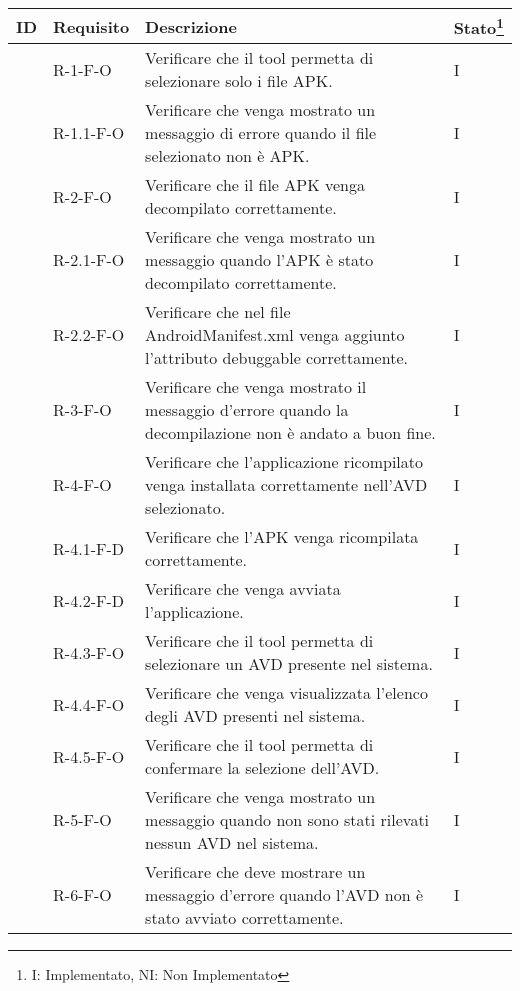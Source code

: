\begin{longtable}{ | C{1.5cm} |C{2cm} |C{7cm} |C{1.5cm}|}
    \hline
    \textbf{ID} &
    \textbf{Requisito} &
    \textbf{Descrizione} &
    \textbf{Stato\footnote{I: Implementato, NI: Non Implementato}} \\\hline

     & R-1-F-O    & Verificare che il tool permetta di selezionare solo i file APK.                                                     & I \\\hline
     & R-1.1-F-O  & Verificare che venga mostrato un messaggio di errore quando il file selezionato non è APK.                          & I \\\hline
     & R-2-F-O    & Verificare che il file APK venga decompilato correttamente.& I \\\hline
     & R-2.1-F-O  & Verificare che venga mostrato un messaggio quando l'APK è stato decompilato correttamente.& I \\\hline
     & R-2.2-F-O  & Verificare che nel file AndroidManifest.xml venga aggiunto l'attributo debuggable correttamente.& I \\\hline
     & R-3-F-O    & Verificare che venga mostrato il messaggio d'errore quando la decompilazione non è andato a buon fine.& I \\\hline
     & R-4-F-O    & Verificare che l'applicazione ricompilato venga installata correttamente nell'AVD selezionato.& I \\\hline
     & R-4.1-F-D  & Verificare che l'APK venga ricompilata correttamente.& I \\\hline
     & R-4.2-F-D  & Verificare che venga avviata l'applicazione.& I \\\hline
     & R-4.3-F-O  & Verificare che il tool permetta di selezionare un AVD presente nel sistema.& I \\\hline
     & R-4.4-F-O  & Verificare che venga visualizzata l'elenco degli AVD presenti nel sistema.& I \\\hline
     & R-4.5-F-O  & Verificare che il tool permetta di confermare la selezione dell'AVD.& I \\\hline
     & R-5-F-O    & Verificare che venga mostrato un messaggio quando non sono stati rilevati nessun AVD nel sistema.& I \\\hline
     & R-6-F-O    & Verificare che deve mostrare un messaggio d'errore quando l'AVD non è stato avviato correttamente.& I \\\hline

\end{longtable}
